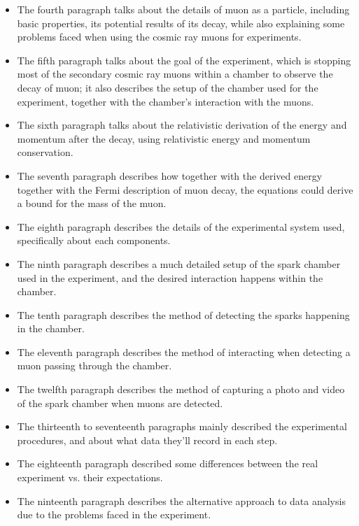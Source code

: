 \documentclass{article}
\begin{document}
\begin{enumerate}
\begin{itemize}
        \item The fourth paragraph talks about the details of muon as a particle, including basic properties, its potential results of its decay, while also explaining some problems faced when using the cosmic ray muons for experiments.
        \item The fifth paragraph talks about the goal of the experiment, which is stopping most of the secondary cosmic ray muons within a chamber to observe the decay of muon; it also describes the setup of the chamber used for the experiment, together with the chamber's interaction with the muons.
        \item The sixth paragraph talks about the relativistic derivation of the energy and momentum after the decay, using relativistic energy and momentum conservation.
        \item The seventh paragraph describes how together with the derived energy together with the Fermi description of muon decay, the equations could derive a bound for the mass of the muon.
        
        \hfil

        \item The eighth paragraph describes the details of the experimental system used, specifically about each components.
        \item The ninth paragraph describes a much detailed setup of the spark chamber used in the experiment, and the desired interaction happens within the chamber.
        \item The tenth paragraph describes the method of detecting the sparks happening in the chamber.
        \item The eleventh paragraph describes the method of interacting when detecting a muon passing through the chamber.
        \item The twelfth paragraph describes the method of capturing a photo and video of the spark chamber when muons are detected.
        
        \hfil

        \item The thirteenth to seventeenth paragraphs mainly described the experimental procedures, and about what data they'll record in each step.
        \item The eighteenth paragraph described some differences between the real experiment vs. their expectations.
        \item The ninteenth paragraph describes the alternative approach to data analysis due to the problems faced in the experiment.
        

\end{itemize}
\end{enumerate}
\end{document}
